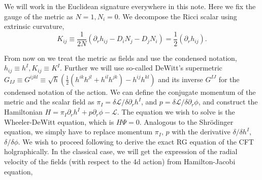 \documentclass[12pt,epsbox]{article}
\numberwithin{equation}{section}
\begin{document}
We will work in the Euclidean signature everywhere in this note.
Here we fix the gauge of the metric as $N=1, N_i=0$. %
 We decompose the Ricci scalar using extrinsic curvature, %
\begin{equation}
K_{ij} \equiv \frac{1}{2N} \left( \partial_r h_{ij} -D_i N_j -D_j N_i \right)=\frac{1}{2}\left( \partial_r h_{ij} \right).
\end{equation}

From now on we treat the metric as fields and use the condensed notation, $h_{ij} \equiv h^I ,K_{ij} \equiv K^I$.
Further we will use so-called DeWitt's supermetric $G_{IJ} \equiv G^{ijkl} \equiv \sqrt{h}\left( \frac{1}{2} (h^{ik}h^{jl}+h^{il}h^{jk})-h^{ij}h^{kl} \right)$ and its inverse $G^{IJ}$ for the condensed notation of the action.
We can define the conjugate momentum of the metric and the scalar field as $\pi_{I}=\delta \mathcal{L} / \delta \partial_r h^I$,
and $p=\delta \mathcal{L} / \delta \partial_r \phi$, and construct the Hamiltonian $H=\pi_I \partial_r h^I + p \partial_r \phi-\mathcal{L}$.
The equation we wish to solve is the Wheeler-DeWitt equation, which is $H \Psi =0$. Analogous to the Shr\"odinger equation, we simply have to replace momentum $\pi_I$, $p$ with the derivative $\delta / \delta h^I$, $\delta / \delta \phi$. We wish to proceed following \cite{VV} to derive the exact RG equation of the CFT holgraphically.
In the classical case, we will get the expression of the radial velocity of the fields (with respect to the 4d action) from Hamilton-Jacobi equation,
\end{document}
